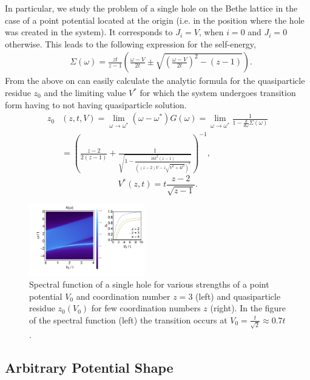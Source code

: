 \documentclass[%
 reprint,
 amsmath,amssymb,
 aps,
prb,
floatfix,
]{revtex4-1}
\begin{document}
In particular, we study the problem of a single hole on the Bethe lattice in the case of a point potential located at the origin (i.e. in the position where the hole was created in the system). It corresponds to $J_i = V$, when $i = 0$ and $J_i = 0$ otherwise. This leads to the following expression for the self-energy,
\begin{equation}
\begin{aligned}
&\Sigma(\omega) = \frac{zt}{z-1} \left( \frac{\omega - V}{2t} \pm \sqrt{\left( \frac{\omega - V}{2t} \right)^2 - (z-1)} \right).
\end{aligned}
\end{equation}
From the above on can easily calculate the analytic formula for the quasiparticle residue $z_0$ and the limiting value $V^*$ for which the system undergoes transition form having to not having quasiparticle solution. 
\begin{equation}
\begin{aligned}
z_0&(z,t,V) = \lim_{\omega\to\omega^*}(\omega - \omega^*)G(\omega) = \lim_{\omega\to\omega^*}\frac{1}{1-\frac{d}{d\omega}\Sigma(\omega)} \\ 
&= \left( \frac{z-2}{2(z-1)} + \frac{1}{\sqrt{1 - \frac{16t^2(z-1)}{ \left( (z-2)V-z\sqrt{V^2 + 4t^2} \right)^2}}}  \right)^{-1},
\end{aligned}
\end{equation}
\begin{equation}
V^*(z,t) = t\frac{z-2}{\sqrt{z-1}}.
\end{equation}

\begin{figure}[ht!]
\includegraphics[width=0.45\textwidth]{plot1}
\caption{Spectral function of a single hole for various strengths of a point potential $V_0$ and coordination number $z = 3$ (left) and quasiparticle residue $z_0(V_0)$ for few coordination numbers $z$ (right). In the figure of the spectral function (left) the transition occurs at $V_0 = \frac{t}{\sqrt{2}} \approx 0.7t$.}
\label{pointpotential}
\end{figure}

\subsection{Arbitrary Potential Shape}
\end{document}
